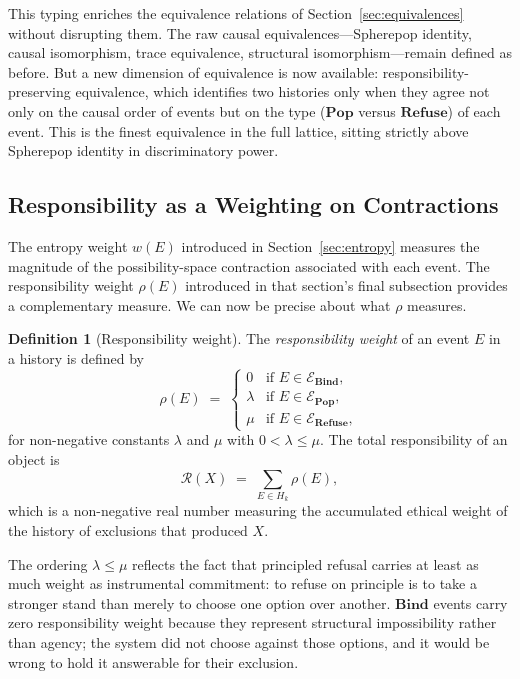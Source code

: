 \documentclass[12pt]{article}
\theoremstyle{plain}
\theoremstyle{definition}
\newtheorem{definition}[theorem]{Definition}
\theoremstyle{remark}
\begin{document}
This typing enriches the equivalence relations of
Section~\ref{sec:equivalences} without disrupting them.  The raw causal
equivalences---Spherepop identity, causal isomorphism, trace equivalence,
structural isomorphism---remain defined as before.  But a new dimension of
equivalence is now available: responsibility-preserving equivalence, which
identifies two histories only when they agree not only on the causal order
of events but on the type ($\mathbf{Pop}$ versus $\mathbf{Refuse}$) of each
event.  This is the finest equivalence in the full lattice, sitting strictly
above Spherepop identity in discriminatory power.

\subsection{Responsibility as a Weighting on Contractions}

The entropy weight $w(E)$ introduced in Section~\ref{sec:entropy} measures the
magnitude of the possibility-space contraction associated with each event.
The responsibility weight $\rho(E)$ introduced in that section's final
subsection provides a complementary measure.  We can now be precise about what
$\rho$ measures.

\begin{definition}[Responsibility weight]
The \emph{responsibility weight} of an event $E$ in a history is defined by
\[
  \rho(E) \;=\;
  \begin{cases}
    0       & \text{if } E \in \mathcal{E}_{\mathbf{Bind}}, \\
    \lambda & \text{if } E \in \mathcal{E}_{\mathbf{Pop}},  \\
    \mu     & \text{if } E \in \mathcal{E}_{\mathbf{Refuse}},
  \end{cases}
\]
for non-negative constants $\lambda$ and $\mu$ with $0 < \lambda \leq \mu$.
The total responsibility of an object is
\[
  \mathcal{R}(X) \;=\; \sum_{E \in H_k} \rho(E),
\]
which is a non-negative real number measuring the accumulated ethical weight
of the history of exclusions that produced $X$.
\end{definition}

The ordering $\lambda \leq \mu$ reflects the fact that principled refusal
carries at least as much weight as instrumental commitment: to refuse on
principle is to take a stronger stand than merely to choose one option over
another.  $\mathbf{Bind}$ events carry zero responsibility weight because they
represent structural impossibility rather than agency; the system did not
choose against those options, and it would be wrong to hold it answerable for
their exclusion.
\end{document}
